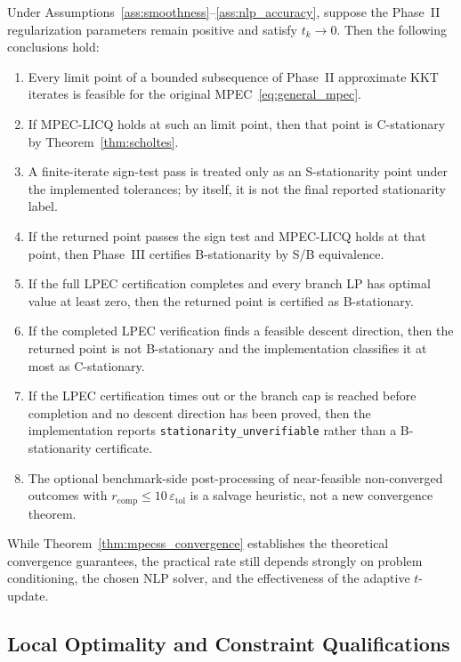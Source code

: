 \begin{theorem}
\label{thm:mpecss_convergence}
Under Assumptions~\ref{ass:smoothness}--\ref{ass:nlp_accuracy}, suppose
the Phase~II regularization parameters remain positive and satisfy
$t_k \to 0$. Then the following conclusions hold:
\begin{enumerate}
  \item Every limit point of a bounded subsequence of Phase~II
  approximate KKT iterates is feasible for the original
  MPEC~\eqref{eq:general_mpec}.
  \item If MPEC-LICQ holds at such an limit point, then that
  point is C-stationary by Theorem~\ref{thm:scholtes}.
  \item A finite-iterate sign-test pass is treated only as an
  S-stationarity point under the implemented tolerances; by itself,
  it is not the final reported stationarity label.
  \item If the returned point passes the sign test and MPEC-LICQ
  holds at that point, then Phase~III certifies B-stationarity by S/B
  equivalence.
  \item If the full LPEC certification completes and every branch LP has
  optimal value at least zero, then the returned point is certified
  as B-stationary.
  \item If the completed LPEC verification finds a feasible descent
  direction, then the returned point is not B-stationary and the
  implementation classifies it at most as C-stationary.
  \item If the LPEC certification times out or the branch cap is reached
  before completion and no descent direction has been proved, then the
  implementation reports \texttt{stationarity\_unverifiable} rather
  than a B-stationarity certificate.
  \item The optional benchmark-side post-processing of near-feasible
  non-converged outcomes with
  $r_{\mathrm{comp}} \le 10\,\varepsilon_{\mathrm{tol}}$ is a salvage
  heuristic, not a new convergence theorem.
\end{enumerate}
\end{theorem}


While Theorem~\ref{thm:mpecss_convergence} establishes the theoretical convergence guarantees, the practical rate still
depends strongly on problem conditioning, the chosen NLP solver, and the
effectiveness of the adaptive $t$-update.

\subsection{Local Optimality and Constraint Qualifications}
\label{sec:local_optimality}

